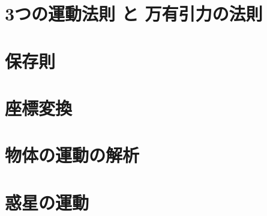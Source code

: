 \chapter{3つの運動法則 と 万有引力の法則}
        


\chapter{保存則}
        

\chapter{座標変換}
        


\chapter{物体の運動の解析}
        

\chapter{惑星の運動}
        

